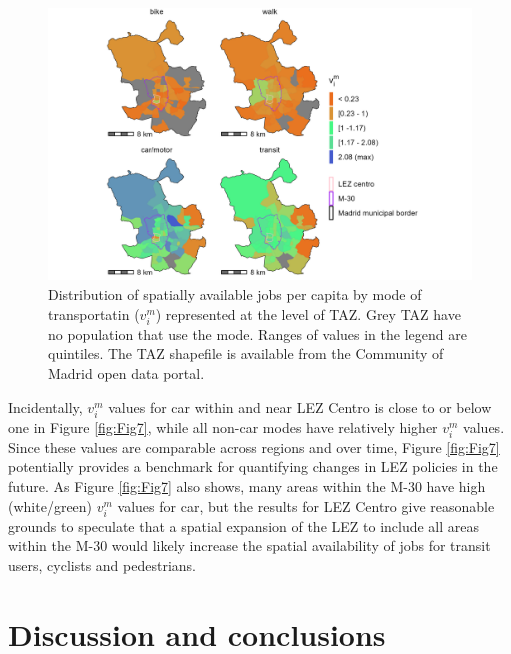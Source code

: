 \documentclass[10pt,letterpaper]{article}
\begin{document}
\begin{figure}

{\centering \includegraphics[width=0.85\linewidth]{images/Fig7} 

}

\caption{\label{fig:Fig7} Distribution of spatially available jobs per capita by mode of transportatin ($v_i^m$) represented at the level of TAZ. Grey TAZ have no population that use the mode. Ranges of values in the legend are quintiles. The TAZ shapefile is available from the Community of Madrid open data portal.}\label{fig:SA-per-capita-m-plot}
\end{figure}

Incidentally, \(v_i^m\) values for car within and near LEZ Centro is
close to or below one in Figure \ref{fig:Fig7}, while all non-car modes
have relatively higher \(v_i^m\) values. Since these values are
comparable across regions and over time, Figure \ref{fig:Fig7}
potentially provides a benchmark for quantifying changes in LEZ policies
in the future. As Figure \ref{fig:Fig7} also shows, many areas within
the M-30 have high (white/green) \(v_i^m\) values for car, but the
results for LEZ Centro give reasonable grounds to speculate that a
spatial expansion of the LEZ to include all areas within the M-30 would
likely increase the spatial availability of jobs for transit users,
cyclists and pedestrians.

\hypertarget{discussion-and-conclusions}{%
\section{Discussion and conclusions}\label{discussion-and-conclusions}}
\end{document}
